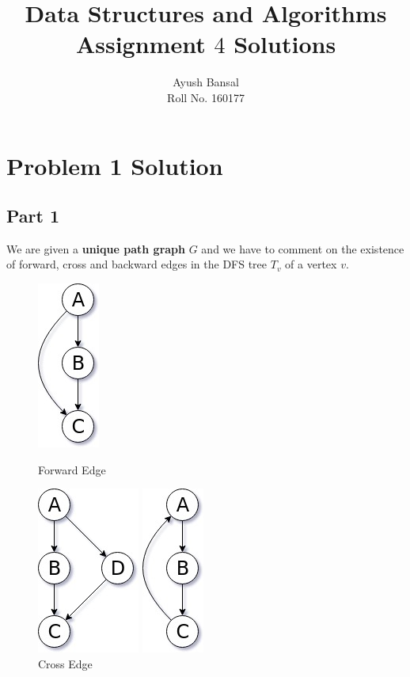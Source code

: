 \documentclass{article}
\title{\vspace{-4ex}\lightgreyb Data Structures and Algorithms \\
\lightgreyb Assignment $4$ Solutions}
\author{Ayush Bansal \\
Roll No. 160177}
\date{\vspace{-4ex}}
\let\bold\textbf
\begin{document}
\maketitle

\section{Problem 1 Solution}{
  \subsection{Part 1}{
    We are given a \bold{unique path graph} $G$ and we have to comment on the existence of forward, cross and backward edges in the DFS tree $T_v$ of a vertex $v$.
    \begin{figure}[h]
      \begin{minipage}[h]{0.24\textwidth}
        \centering
        \includegraphics[scale=0.3]{forward}
        \caption{Forward Edge}
      \end{minipage}
      \begin{minipage}[h]{0.24\textwidth}
        \centering
        \includegraphics[scale=0.3]{cross}
        \caption{Cross Edge}
      \end{minipage}
      \begin{minipage}[h]{0.24\textwidth}
        \centering
        \includegraphics[scale=0.3]{back}

\end{minipage}
\end{figure}}}
\end{document}
